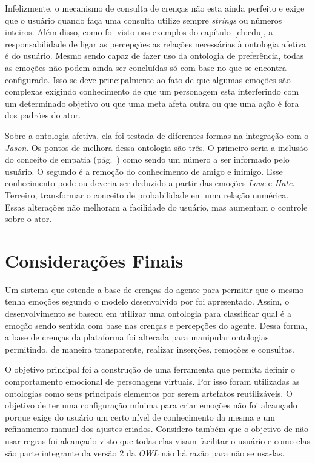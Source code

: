 Infelizmente, o mecanismo de consulta de crenças não esta ainda perfeito e
exige que o usuário quando faça uma consulta utilize sempre \emph{strings} ou
números inteiros. Além disso, como foi visto nos exemplos do
capítulo~\ref{ch:cdu}, a responsabilidade de ligar as percepções as relações
necessárias à ontologia afetiva é do usuário. Mesmo sendo capaz de fazer uso
da ontologia de preferência, todas as emoções não podem ainda ser concluídas
só com base no que se encontra configurado. Isso se deve principalmente ao
fato de que algumas emoções são complexas exigindo conhecimento de que um
personagem esta interferindo com um determinado objetivo ou que uma meta afeta
outra ou que uma ação é fora dos padrões do ator.

Sobre a ontologia afetiva, ela foi testada de diferentes formas na integração
com o \emph{Jason}.
Os pontos de melhora dessa
ontologia são três. O primeiro seria a inclusão do conceito de empatia
(pág.~\pageref{mark:empat}) como sendo um número a ser informado pelo usuário.
O segundo é a remoção do conhecimento de amigo e inimigo. Esse conhecimento
pode ou deveria ser deduzido a partir das emoções \emph{Love} e \emph{Hate}.
Terceiro, transformar o conceito de probabilidade em uma relação numérica.
Essas alterações não melhoram a facilidade do usuário, mas aumentam o controle
sobre o ator.

\section{Considerações Finais}

Um sistema que estende a base de crenças do agente \jason para permitir que o
mesmo tenha emoções segundo o modelo desenvolvido por \citet{ortony1988cse}
foi apresentado. Assim, o desenvolvimento se baseou em utilizar uma ontologia
para classificar qual é a emoção sendo sentida com base nas crenças e
percepções do agente.
Dessa forma, a base de crenças da plataforma foi alterada para manipular
ontologias permitindo, de maneira transparente, realizar inserções, remoções e
consultas.

O objetivo principal foi a construção de uma ferramenta que permita definir o
comportamento emocional de personagens virtuais. Por isso foram utilizadas as ontologias
como seus principais elementos por serem artefatos reutilizáveis. O objetivo
de ter uma configuração mínima para criar emoções não foi alcançado porque
exige do usuário um certo nível de conhecimento da mesma e um refinamento
manual dos ajustes criados. Considero também que o objetivo de não usar regras
foi alcançado visto que todas elas visam facilitar o usuário e como elas são
parte integrante da versão 2 da \emph{OWL} não há razão para não se usa-las.

